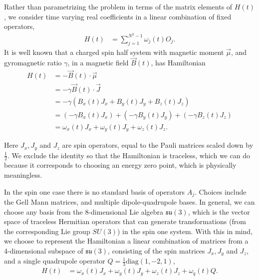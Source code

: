 \documentclass{jors}
\begin{document}
		Rather than parametrizing the problem in terms of the matrix elements of \(H(t)\), we consider time varying real coefficients in a linear combination of fixed operators,
		\begin{align}
			H(t) &= \sum_{j = 1}^{N^2 - 1} \omega_j(t) O_j.
		\end{align}
		It is well known that a charged spin half system with magnetic moment \(\overrightarrow{\mu}\), and gyromagnetic ratio \(\gamma\), in a magnetic field \(\overrightarrow{B}(t)\), has Hamiltonian
		\begin{align}
			H(t) &= -\overrightarrow{B}(t)\cdot \overrightarrow{\mu}\\
			&= -\gamma \overrightarrow{B}(t)\cdot \overrightarrow{J}\\
			&= -\gamma \left(B_x(t) J_x + B_y(t) J_y + B_z(t) J_z\right)\\
			&= \left(-\gamma B_x(t) J_x\right) + \left(-\gamma B_y(t) J_y\right) + \left(-\gamma B_z(t) J_z\right)\\
			&= \omega_x(t) J_x + \omega_y(t) J_y + \omega_z(t) J_z.
		\end{align}

		Here \(J_x, J_y\) and \(J_z\) are spin operators, equal to the Pauli matrices scaled down by \(\frac12\).
		We exclude the identity so that the Hamiltonian is traceless, which we can do because it corresponds to choosing an energy zero point, which is physically meaningless.

		In the spin one case there is no standard basis of operators \(A_j\).
		Choices include the Gell Mann matrices, and multiple dipole-quadrupole bases\cite{hamley_spin-nematic_2012}\cite{di_dipolequadrupole_2010}.
		In general, we can choose any basis from the 8-dimensional Lie algebra \(\mathfrak{su}(3)\), which is the vector space of traceless Hermitian operators that can generate transformations (from the corresponding Lie group \(SU(3)\)) in the spin one system.
		With this in mind, we choose to represent the Hamiltonian a linear combination of matrices from a 4-dimensional subspace of \(\mathfrak{su}(3)\), consisting of the spin matrices \(J_x, J_y\) and \(J_z\), and a single quadrupole operator \(Q = \frac13\mathrm{diag}(1, -2, 1)\),
		\begin{align}
			H(t) &= \omega_x(t) J_x + \omega_y(t) J_y + \omega_z(t) J_z + \omega_q(t) Q.
		\end{align}
		
\end{document}
